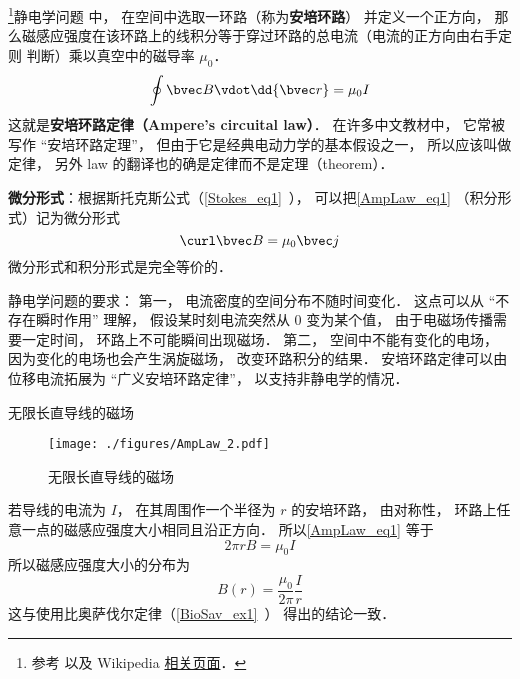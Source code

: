 

\footnote{参考 \cite{GriffE} 以及 Wikipedia \href{https://en.wikipedia.org/wiki/Ampère's_circuital_law}{相关页面}．}静电学问题%
中， 在空间中选取一环路（称为\textbf{安培环路}） 并定义一个正方向， 那么磁感应强度在该环路上的线积分等于穿过环路的总电流（电流的正方向由右手定则 判断）乘以真空中的磁导率 $\mu_0$．
\begin{equation}\label{AmpLaw_eq1}
\oint \bvec B \vdot \dd{\bvec r} = \mu_0 I
\end{equation}
这就是\textbf{安培环路定律（Ampere's circuital law）}． 在许多中文教材中， 它常被写作 “安培环路定理”， 但由于它是经典电动力学的基本假设之一， 所以应该叫做定律， 另外 law 的翻译也的确是定律而不是定理（theorem）．

\textbf{微分形式}：根据斯托克斯公式（\autoref{Stokes_eq1}~）， 可以把\autoref{AmpLaw_eq1} （积分形式）记为微分形式
\begin{equation}\label{AmpLaw_eq2}
\curl \bvec B = \mu_0 \bvec j
\end{equation}
微分形式和积分形式是完全等价的．

静电学问题的要求： 第一， 电流密度的空间分布不随时间变化． 这点可以从 “不存在瞬时作用” 理解， 假设某时刻电流突然从 0 变为某个值， 由于电磁场传播需要一定时间， 环路上不可能瞬间出现磁场． 第二， 空间中不能有变化的电场， 因为变化的电场也会产生涡旋磁场， 改变环路积分的结果． 安培环路定律可以由位移电流拓展为 “广义安培环路定律”， 以支持非静电学的情况．

\begin{example}{无限长直导线的磁场}\label{AmpLaw_ex1}
\begin{figure}[ht]
\centering
\texttt{[image: ./figures/AmpLaw\_2.pdf]}
\caption{无限长直导线的磁场} \label{AmpLaw_fig2}
\end{figure}
若导线的电流为 $I$， 在其周围作一个半径为 $r$ 的安培环路， 由对称性， 环路上任意一点的磁感应强度大小相同且沿正方向． 所以\autoref{AmpLaw_eq1} 等于
\begin{equation}
2\pi r B = \mu_0 I
\end{equation}
所以磁感应强度大小的分布为
\begin{equation}
B(r) = \frac{\mu_0}{2\pi} \frac Ir
\end{equation}
这与使用比奥萨伐尔定律（\autoref{BioSav_ex1}~） 得出的结论一致．
\end{example}

